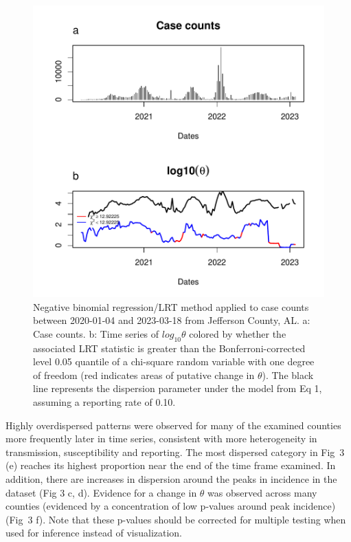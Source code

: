 \documentclass[10pt,letterpaper]{article}
\begin{document}
\begin{figure}[!h]
\includegraphics[width=1\textwidth]{fig2.pdf}
\caption{Negative binomial regression/LRT method applied to case counts between 2020-01-04 and 2023-03-18 from Jefferson County, AL. a: Case counts. b: Time series of $log_{10}\theta$ colored by whether the associated LRT statistic is greater than the Bonferroni-corrected level 0.05 quantile of a chi-square random variable with one degree of freedom (red indicates areas of putative change in $\theta$). The black line represents the dispersion parameter under the model from Eq 1, assuming a reporting rate of 0.10.
}
\label{fig2}
\end{figure}

Highly overdispersed patterns were observed for many of the examined counties more frequently later in time series, consistent with more heterogeneity in transmission, susceptibility and reporting. 
The most dispersed category in Fig\ 3 (e) reaches its highest proportion near the end of the time frame examined.
In addition, there are increases in dispersion around the peaks in incidence in the dataset (Fig 3 c, d).
Evidence for a change in \begin{math}\theta\end{math} was observed across many counties (evidenced by a concentration of low p-values around peak incidence) (Fig\ 3 f). Note that these p-values should be corrected for multiple testing when used for inference instead of visualization.
\end{document}
